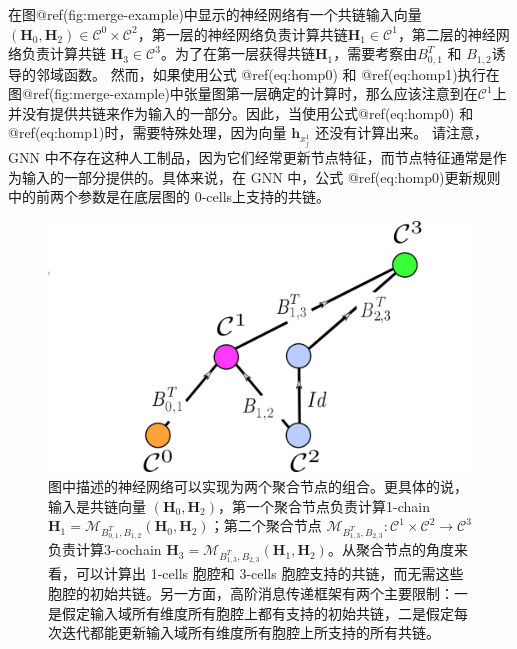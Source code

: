 \documentclass[
  12pt,
]{krantz}
\begin{document}
在图@ref(fig:merge-example)中显示的神经网络有一个共链输入向量
\((\mathbf{H}_0,\mathbf{H}_2) \in  \mathcal{C}^0 \times \mathcal{C}^2\)，第一层的神经网络负责计算共链\(\mathbf{H}_1 \in \mathcal{C}^1\)，第二层的神经网络负责计算共链
\(\mathbf{H}_3\in \mathcal{C}^3\)。为了在第一层获得共链\(\mathbf{H}_1\)，需要考察由\(B_{0,1}^T\)
和 \(B_{1,2}\)诱导的邻域函数。 然而，如果使用公式 @ref(eq:homp0) 和
@ref(eq:homp1)执行在图@ref(fig:merge-example)中张量图第一层确定的计算时，那么应该注意到在\(\mathcal{C}^1\)上并没有提供共链来作为输入的一部分。因此，当使用公式@ref(eq:homp0)
和@ref(eq:homp1)时，需要特殊处理，因为向量 \(\mathbf{h}_{x^1_j}\)
还没有计算出来。 请注意，GNN
中不存在这种人工制品，因为它们经常更新节点特征，而节点特征通常是作为输入的一部分提供的。具体来说，在
GNN 中，公式 @ref(eq:homp0)更新规则中的前两个参数是在底层图的
0-cells上支持的共链。

\begin{figure}

{\centering \includegraphics{figures/merge_example_scaled} 

}

\caption{图中描述的神经网络可以实现为两个聚合节点的组合。更具体的说，输入是共链向量 $(\mathbf{H}_0,\mathbf{H}_2)$，第一个聚合节点负责计算1-chain $\mathbf{H}_1 = \mathcal{M}_{B_{0,1}^T,B_{1,2}} (\mathbf{H}_0,\mathbf{H}_2)$；第二个聚合节点 $\mathcal{M}_{B_{1,3}^T, B_{2,3}} \colon\mathcal{C}^1 \times \mathcal{C}^2 \to \mathcal{C}^3$负责计算3-cochain $\mathbf{H}_3=\mathcal{M}_{B_{1,3}^T, B_{2,3}}(\mathbf{H}_1,\mathbf{H}_2)$。从聚合节点的角度来看，可以计算出 1-cells 胞腔和 3-cells 胞腔支持的共链，而无需这些胞腔的初始共链。另一方面，高阶消息传递框架有两个主要限制：一是假定输入域所有维度所有胞腔上都有支持的初始共链，二是假定每次迭代都能更新输入域所有维度所有胞腔上所支持的所有共链。}\label{fig:merge-example}
\end{figure}
\end{document}

